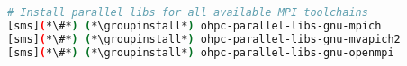 
\begin{lstlisting}[language=bash,keywords={},upquote=true,keepspaces]
# Install parallel libs for all available MPI toolchains
[sms](*\#*) (*\groupinstall*) ohpc-parallel-libs-gnu-mpich
[sms](*\#*) (*\groupinstall*) ohpc-parallel-libs-gnu-mvapich2
[sms](*\#*) (*\groupinstall*) ohpc-parallel-libs-gnu-openmpi
\end{lstlisting}
